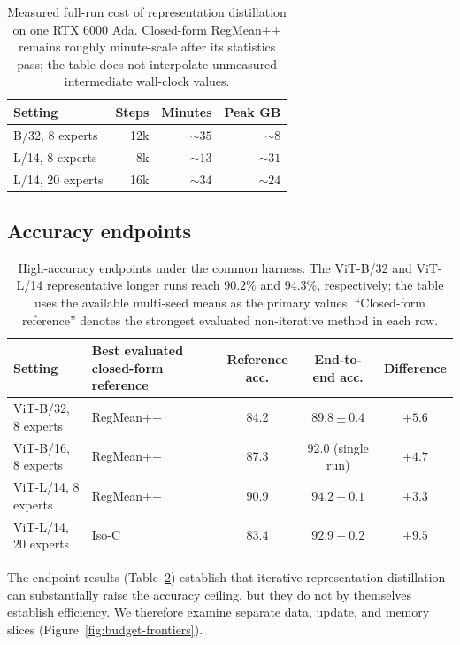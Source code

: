 \documentclass[letterpaper]{article} %
\theoremstyle{plain}
\theoremstyle{definition}
\begin{document}
\begin{table}[tb]
\centering
\small
\setlength{\tabcolsep}{3.5pt}
\begin{tabular*}{\columnwidth}{@{\extracolsep{\fill}}lrrr}
\toprule
Setting & Steps & Minutes & Peak GB \\
\midrule
B/32, 8 experts & 12k & $\sim35$ & $\sim8$ \\
L/14, 8 experts & 8k & $\sim13$ & $\sim31$ \\
L/14, 20 experts & 16k & $\sim34$ & $\sim24$ \\
\bottomrule
\end{tabular*}
\caption{Measured full-run cost of representation distillation on one RTX 6000 Ada.
Closed-form RegMean++ remains roughly minute-scale after its statistics pass; the table does not interpolate unmeasured intermediate wall-clock values.}
\label{tab:measured-cost-main}
\end{table}

\subsection{Accuracy endpoints}

\begin{table}[tb]
\centering
\small
\setlength{\tabcolsep}{5pt}
\begin{tabular}{l l c c c}
\toprule
Setting & Best evaluated closed-form reference & Reference acc. & End-to-end acc. & Difference \\
\midrule
ViT-B/32, 8 experts & RegMean++ & 84.2 & $89.8\pm0.4$ & $+5.6$ \\
ViT-B/16, 8 experts & RegMean++ & 87.3 & 92.0 (single run) & $+4.7$ \\
ViT-L/14, 8 experts & RegMean++ & 90.9 & $94.2\pm0.1$ & $+3.3$ \\
ViT-L/14, 20 experts & Iso-C & 83.4 & $92.9\pm0.2$ & $+9.5$ \\
\bottomrule
\end{tabular}
\caption{High-accuracy endpoints under the common harness. The ViT-B/32 and ViT-L/14
representative longer runs reach $90.2\%$ and $94.3\%$, respectively; the table uses the available multi-seed means as the primary values.
``Closed-form reference'' denotes the strongest evaluated non-iterative method in each row.}
\label{tab:accuracy-endpoints}
\end{table}

The endpoint results (Table~\ref{tab:accuracy-endpoints}) establish that iterative representation distillation can substantially raise the accuracy ceiling, but they do not by themselves establish efficiency.
We therefore examine separate data, update, and memory slices (Figure~\ref{fig:budget-frontiers}).
\end{document}
